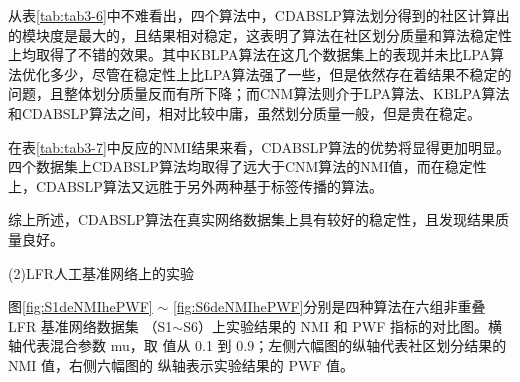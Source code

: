从表\ref{tab:tab3-6}中不难看出，四个算法中，CDABSLP算法划分得到的社区计算出的模块度是最大的，且结果相对稳定，这表明了算法在社区划分质量和算法稳定性上均取得了不错的效果。其中KBLPA算法在这几个数据集上的表现并未比LPA算法优化多少，尽管在稳定性上比LPA算法强了一些，但是依然存在着结果不稳定的问题，且整体划分质量反而有所下降；而CNM算法则介于LPA算法、KBLPA算法和CDABSLP算法之间，相对比较中庸，虽然划分质量一般，但是贵在稳定。

在表\ref{tab:tab3-7}中反应的NMI结果来看，CDABSLP算法的优势将显得更加明显。四个数据集上CDABSLP算法均取得了远大于CNM算法的NMI值，而在稳定性上，CDABSLP算法又远胜于另外两种基于标签传播的算法。

综上所述，CDABSLP算法在真实网络数据集上具有较好的稳定性，且发现结果质量良好。

(2)LFR人工基准网络上的实验

图\ref{fig:S1deNMIhePWF} $\sim$ \ref{fig:S6deNMIhePWF}分别是四种算法在六组非重叠 LFR 基准网络数据集
（S1$\sim$S6）上实验结果的 NMI 和 PWF 指标的对比图。横轴代表混合参数 mu，取
值从 0.1 到 0.9；左侧六幅图的纵轴代表社区划分结果的 NMI 值，右侧六幅图的
纵轴表示实验结果的 PWF 值。

